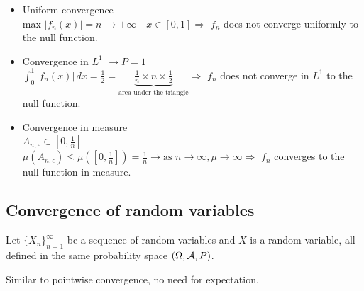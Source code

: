 {\begin{itemize}
                $\Rightarrow \displaystyle f_n(x)\to
                \begin{cases}
                    0 & \text{if }x\in[0,1]\\
                    \infty & \text{if }x=0
                \end{cases} 
                \Rightarrow$ $f_n$ is not converging pointwise to the null function.
        \item Uniform convergence\\
                max $|f_n(x)| = n\, \rightarrow +\infty\quad x\in [0,1] \Rightarrow$ $f_n$ does not converge uniformly to the null function.
        \item Convergence in $L^1$
                $\rightarrow P = 1$\\
                $\displaystyle \int_{0}^{1}|f_n(x)|\, dx = \frac{1}{2} = \underbrace{\frac{1}{n}\times n\times\frac{1}{2}}_{\text{area under the triangle}}\Rightarrow$
                $f_n$ does not converge in $L^1$ to the null function.
        \item Convergence in measure\\
                $A_{n,\epsilon}\subset [0,\frac{1}{n}]$\\
                $\mu(A_{n,\epsilon})\leq\mu([0,\frac{1}{n}]) = \frac{1}{n}
                \rightarrow\text{as }n\to\infty, \mu\to\infty \Rightarrow$
                $f_n$ converges to the null function in measure.
    \end{itemize}
}

\subsection{Convergence of random variables}

Let $\{X_n\}_{n=1}^{\infty}$ be a sequence of random variables and $X$ is a random variable,
all defined in the same probability space $(\Omega, \mathcal{A}, P)$.

Similar to pointwise convergence, no need for expectation.

